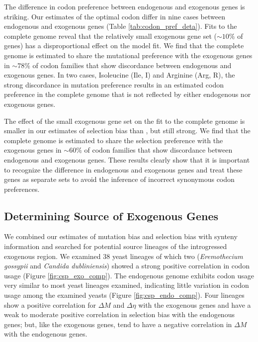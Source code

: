 The difference in codon preference between endogenous and exogenous genes is striking.
Our estimates of the optimal codon differ in nine cases between endogenous and exogenous genes (Table \ref{tab:codon_pref_deta}).
Fits to the complete \kluyveri genome reveal that the relatively small exogenous gene set ($\sim 10\%$ of genes) has a disproportional effect on the model fit.
We find that the complete \kluyveri genome is estimated to share the mutational preference with the exogenous genes in $\sim78\%$ of codon families that show discordance between endogenous and exogenous genes.
In two cases, Isoleucine (Ile, I) and Arginine (Arg, R), the strong discordance in mutation preference results in an estimated codon preference in the complete \kluyveri genome that is not reflected by either endogenous nor exogenous genes.

The effect of the small exogenous gene set on the fit to the complete \kluyveri genome is smaller in our estimates of selection bias \DE than \DM, but still strong.
We find that the complete \kluyveri genome is estimated to share the selection preference with the exogenous genes in $\sim60\%$ of codon families that show discordance between endogenous and exogenous genes.
These results clearly show that it is important to recognize the difference in endogenous and exogenous genes and treat these genes as separate sets to avoid the inference of incorrect synonymous codon preferences.

\subsection{Determining Source of Exogenous Genes}

We combined our estimates of mutation bias \DM and selection bias \DE with synteny information and searched for potential source lineages of the introgressed exogenous region.
We examined 38 yeast lineages of which two (\emph{Eremothecium gossypii} and \emph{Candida dubliniensis}) showed a strong positive correlation in codon usage (Figure \ref{fig:csp_exo_comp}).
The endogenous \kluyveri genome exhibits codon usage very similar to most yeast lineages examined, indicating little variation in codon usage among the examined yeasts (Figure \ref{fig:csp_endo_comp}).
Four lineages show a positive correlation for $\Delta M$ and $\Delta \eta$ with the exogenous genes and have a weak to moderate positive correlation in selection bias with the endogenous genes; but, like the exogenous genes, tend to have a negative correlation in $\Delta M$ with the endogenous genes.

